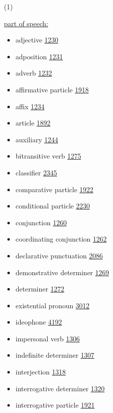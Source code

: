 \documentclass[a4paper,12pt]{article}
\begin{document}
\hypertarget{1}{(1)}
\hyperlink{pos}{part of speech:}
\begin{itemize}
\item adjective \href{http://www.isocat.org/datcat/DC-1230}{1230}
\item adposition \href{http://www.isocat.org/datcat/DC-1231}{1231}
\item adverb \href{http://www.isocat.org/datcat/DC-1232}{1232}
\item affirmative particle \href{http://www.isocat.org/datcat/DC-1918}{1918}
\item affix \href{http://www.isocat.org/datcat/DC-1234}{1234}
\item article \href{http://www.isocat.org/datcat/DC-1892}{1892}
\item auxiliary \href{http://www.isocat.org/datcat/DC-1244}{1244}
\item bitransitive verb \href{http://www.isocat.org/datcat/DC-1275}{1275}
\item classifier \href{http://www.isocat.org/datcat/DC-2345}{2345}
\item comparative particle \href{http://www.isocat.org/datcat/DC-1922}{1922}
\item conditional particle \href{http://www.isocat.org/datcat/DC-2230}{2230}
\item conjunction \href{http://www.isocat.org/datcat/DC-1260}{1260}
\item coordinating conjunction \href{http://www.isocat.org/datcat/DC-1262}{1262}
\item declarative punctuation \href{http://www.isocat.org/datcat/DC-2086}{2086}
\item demonstrative determiner \href{http://www.isocat.org/datcat/DC-1269}{1269}
\item determiner \href{http://www.isocat.org/datcat/DC-1272}{1272}
\item existential pronoun \href{http://www.isocat.org/datcat/DC-3012}{3012}
\item ideophone \href{http://www.isocat.org/datcat/DC-4192}{4192}
\item impersonal verb \href{http://www.isocat.org/datcat/DC-1306}{1306}
\item indefinite determiner \href{http://www.isocat.org/datcat/DC-1307}{1307}
\item interjection \href{http://www.isocat.org/datcat/DC-1318}{1318}
\item interrogative determiner \href{http://www.isocat.org/datcat/DC-1320}{1320}
\item interrogative particle \href{http://www.isocat.org/datcat/DC-1921}{1921}

\end{itemize}
\end{document}
